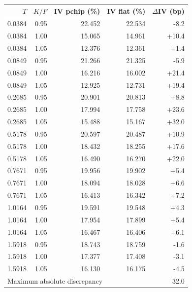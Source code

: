 \begin{tabular}{rrrrr}
\toprule
$T$ & $K/F$ & IV pchip (\%) & IV flat (\%) & $\Delta$IV (bp)\\
\midrule
0.0384 & 0.95 & 22.452 & 22.534 & -8.2\\
0.0384 & 1.00 & 15.065 & 14.961 & +10.4\\
0.0384 & 1.05 & 12.376 & 12.361 & +1.4\\
0.0849 & 0.95 & 21.266 & 21.325 & -5.9\\
0.0849 & 1.00 & 16.216 & 16.002 & +21.4\\
0.0849 & 1.05 & 12.925 & 12.731 & +19.4\\
0.2685 & 0.95 & 20.901 & 20.813 & +8.8\\
0.2685 & 1.00 & 17.994 & 17.758 & +23.6\\
0.2685 & 1.05 & 15.488 & 15.167 & +32.0\\
0.5178 & 0.95 & 20.597 & 20.487 & +10.9\\
0.5178 & 1.00 & 18.432 & 18.255 & +17.6\\
0.5178 & 1.05 & 16.490 & 16.270 & +22.0\\
0.7671 & 0.95 & 19.956 & 19.902 & +5.4\\
0.7671 & 1.00 & 18.094 & 18.028 & +6.6\\
0.7671 & 1.05 & 16.413 & 16.342 & +7.2\\
1.0164 & 0.95 & 19.591 & 19.548 & +4.3\\
1.0164 & 1.00 & 17.954 & 17.899 & +5.4\\
1.0164 & 1.05 & 16.467 & 16.406 & +6.1\\
1.5918 & 0.95 & 18.743 & 18.759 & -1.6\\
1.5918 & 1.00 & 17.377 & 17.408 & -3.1\\
1.5918 & 1.05 & 16.130 & 16.175 & -4.5\\
\midrule
\multicolumn{4}{l}{Maximum absolute discrepancy} & 32.0\\
\bottomrule
\end{tabular}
